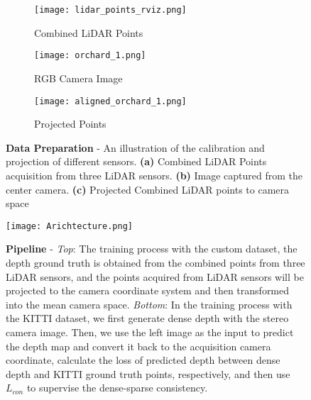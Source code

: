 \documentclass{article}
\begin{document}
    \begin{figure}[htbp]
         \centering
         \begin{subfigure}[t]{0.23\textwidth}
             \centering
             \texttt{[image: lidar\_points\_rviz.png]}
             \caption{Combined LiDAR Points}
             \label{fig:rviz lidar points}
         \end{subfigure}
         \hfill
         \begin{subfigure}[t]{0.23\textwidth}
             \centering
             \texttt{[image: orchard\_1.png]}
             \caption{RGB Camera Image}
             \label{fig:orchard scene 1}
         \end{subfigure}
         \hfill
         \begin{subfigure}[t]{0.23\textwidth}
             \centering
             \texttt{[image: aligned\_orchard\_1.png]}
             \caption{Projected Points}
             \label{fig:visual points in orchard 1}
         \end{subfigure}
            \caption{ \textbf{Data Preparation} - An illustration of the calibration and projection of different sensors. \textbf{(a)} Combined LiDAR Points acquisition from three LiDAR sensors. \textbf{(b)} Image captured from the center camera. \textbf{(c)} Projected Combined LiDAR points to camera space}
            \label{fig:Data Preparation Demostration}
    \end{figure}
    
\begin{figure*}[t]
    \centering
    \texttt{[image: Arichtecture.png]}
    \caption{\textbf{Pipeline} - \textit{Top}: The training process with the custom dataset, the depth ground truth is obtained from the combined points from three LiDAR sensors, and the points acquired from LiDAR sensors will be projected to the camera coordinate system and then transformed into the mean camera space. \textit{Bottom}: In the training process with the KITTI dataset, we first generate dense depth with the stereo camera image. Then, we use the left image as the input to predict the depth map and convert it back to the acquisition camera coordinate, calculate the loss of predicted depth between dense depth and KITTI ground truth points, respectively, and then use \(L_{con}\) to supervise the dense-sparse consistency.}
    \label{fig:Model Architecture}
\end{figure*}
\end{document}

